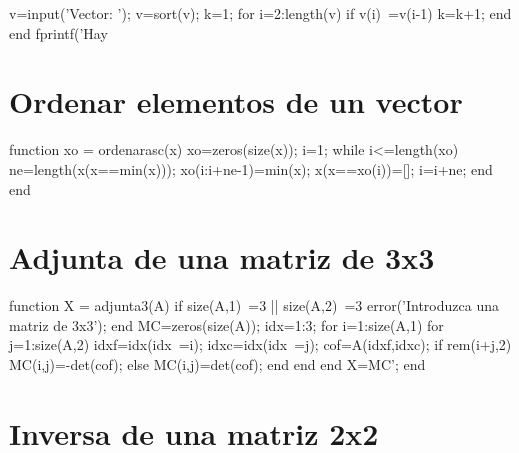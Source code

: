 
\sol

\begin{matlab}
v=input('Vector: ');
v=sort(v);
k=1;
for i=2:length(v)
    if v(i)~=v(i-1)
        k=k+1;
    end
end
fprintf('Hay %
\end{matlab}

\section{Ordenar elementos de un vector}


\sol

\begin{matlab}
function xo = ordenarasc(x)
%
xo=zeros(size(x));
i=1;
while i<=length(xo)
    ne=length(x(x==min(x)));
    xo(i:i+ne-1)=min(x);
    x(x==xo(i))=[];
    i=i+ne;
end
end
\end{matlab}

\section{Adjunta de una matriz de 3x3}


\sol

\begin{matlab}
function X = adjunta3(A)
%
if size(A,1)~=3 || size(A,2)~=3
    error('Introduzca una matriz de 3x3');
end
MC=zeros(size(A));
idx=1:3;
for i=1:size(A,1)
    for j=1:size(A,2)
        idxf=idx(idx~=i);
        idxc=idx(idx~=j);
        cof=A(idxf,idxc);
        if rem(i+j,2)
            MC(i,j)=-det(cof);
        else
            MC(i,j)=det(cof);
        end
    end
end
X=MC';
end
\end{matlab}


\section{Inversa de una matriz 2x2}

